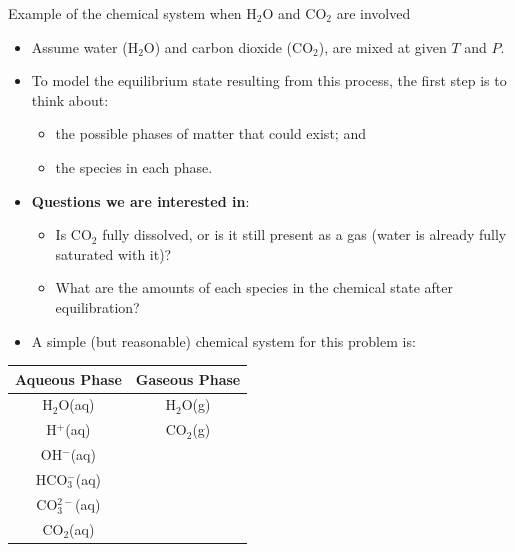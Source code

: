 %
\begin{frame}{Example of the chemical system when H$_{2}$O and CO$_{2}$ are involved}

\lcol
\begin{itemize}
\item Assume water (H$_{2}$O) and carbon dioxide (CO$_{2}$), are mixed
at given $T$ and $P$. 
\item To model the equilibrium state resulting from this process, the first
step is to think about:
\begin{itemize}
\item the possible phases of matter that could exist; and
\item the species in each phase. 
\end{itemize}
%
\item \alert{\textbf{Questions we are interested in}}: 
\begin{itemize}
\item Is CO$_{2}$ fully dissolved, or is it still present as a gas (water is already fully saturated with it)?
\item What are the amounts of each species in the chemical state after equilibration?
\end{itemize}
\end{itemize}
\rcol
\begin{itemize}
\item A simple (but reasonable) chemical system for this problem is:
\end{itemize}
\begin{center}
\begin{tabular}{cc}
\toprule 
\textbf{Aqueous Phase} & \textbf{Gaseous Phase}\tabularnewline
\midrule
H$_{2}$O(aq) & H$_{2}$O(g)\tabularnewline
H$^{+}$(aq) & CO$_{2}$(g)\tabularnewline
OH$^{-}$(aq) & \tabularnewline
HCO$_{3}^{-}$(aq) & \tabularnewline
CO$_{3}^{2-}$(aq) & \tabularnewline
CO$_{2}$(aq) & \tabularnewline
\bottomrule
\end{tabular}
\par\end{center}

\ecol
\end{frame}
%
